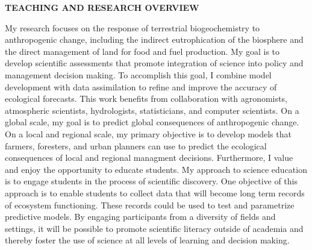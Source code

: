 \documentclass[12pt,twoside]{article}
\begin{document}
{ %

\textbf{TEACHING AND RESEARCH OVERVIEW}
\par\medskip
My research focuses on the response of terrestrial biogeochemistry to anthropogenic change, including the indirect eutrophication of the biosphere and the direct management of land for food and fuel production. My goal is to develop scientific assessments that promote integration of science into policy and management decision making. 
To accomplish this
goal, I combine model development with data assimilation to refine and improve the accuracy of ecological
forecasts. This work benefits from collaboration with agronomists, atmospheric scientists, hydrologists,
statisticians, and computer scientists. On a global scale, my goal is to predict global consequences of anthropogenic
change. On a local and regional scale, my primary objective is to develop models that farmers,
foresters, and urban planners can use to predict the ecological consequences of local and regional managment
decisions. Furthermore, I value and enjoy the opportunity to educate students. My approach to science
education is to engage students in the process of scientific discovery. One objective of this approach is to
enable students to collect data that will become long term records of ecosystem functioning. These records
could be used to test and parametrize predictive models. By engaging participants from a diversity of fields
and settings, it will be possible to promote scientific literacy outside of academia and thereby foster the use
of science at all levels of learning and decision making.
}
\end{document}
